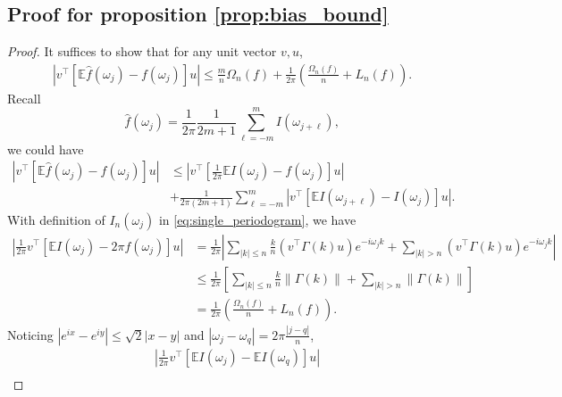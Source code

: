 \subsection*{Proof for proposition \ref{prop:bias_bound}}
\begin{proof}
It suffices to show that for any unit vector $v,u$, 
\begin{equation}
\begin{aligned}
\left|v^\top \left[\mathbb{E}\hat{f}(\omega_j) - f(\omega_j)\right]u\right| \le \frac{m}{n}\Omega_n(f) + \frac{1}{2\pi}\left(\frac{\Omega_n(f)}{n}+L_n(f)\right). 
\end{aligned}
\end{equation}
Recall 
\begin{equation}
\hat{f}(\omega_j) = \frac{1}{2\pi}\frac{1}{2m+1} \sum_{\ell =-m}^m I(\omega_{j+\ell}), 
\end{equation}
we could have 
\begin{equation}
\label{eq:mul_dev}
\begin{aligned}
\left|v^\top \left[\mathbb{E}\hat{f}(\omega_j) - f(\omega_j)\right]u\right| 
&\le \left|v^\top \left[\frac{1}{2\pi}\mathbb{E}I(\omega_j) - f(\omega_j)\right]u\right|\\
&+\frac{1}{2\pi(2m+1)} \sum_{\ell = -m}^m |v^\top\left[\mathbb{E}I(\omega_{j+\ell}) - I(\omega_{j})\right]u|.
\end{aligned}
\end{equation}
With definition of $I_n(\omega_j)$ in \eqref{eq:single_periodogram}, we have 
\begin{equation}
\label{eq:mul_dev1}
\begin{aligned}
\left|\frac{1}{2\pi} v^\top \left[\mathbb{E} I(\omega_j) - 2\pi f(\omega_j)\right]u\right| &= \frac{1}{2\pi}\left|\sum_{|k|\le n} \frac{k}{n}  (v^\top \Gamma(k)u) e^{-i\omega_j k}+\sum_{|k|>n} (v^\top \Gamma(k)u) e^{-i\omega_jk}\right|\\
&\le \frac{1}{2\pi} \left [\sum_{|k|\le n} \frac{k}{n}  \|\Gamma(k)\|+ \sum_{|k|>n}\|\Gamma(k)\|\right]\\
&= \frac{1}{2\pi}\left(\frac{\Omega_n(f)}{n} + L_n(f)\right).
\end{aligned}
\end{equation}
Noticing $|e^{ix} - e^{iy}|\le \sqrt{2} |x-y|$ and $|\omega_j-\omega_q| = 2\pi \frac{|j-q|}{n}$, 
\begin{equation}
\label{eq:mul_dev2}
\begin{aligned}
&\left|\frac{1}{2\pi} v^\top \left[\mathbb{E} I(\omega_j) - \mathbb{E} I(\omega_q) \right]u\right| \\

\end{aligned}
\end{equation}
\end{proof}
